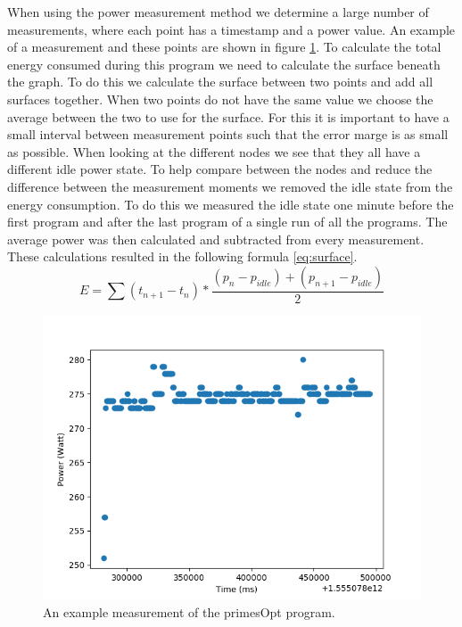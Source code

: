 When using the power measurement method we determine a large number of measurements, where each point has a timestamp and a power value. An example of a measurement and these points are shown in figure \ref{fig:primesOpt}. To calculate the total energy consumed during this program we need to calculate the surface beneath the graph. To do this we calculate the surface between two points and add all surfaces together. When two points do not have the same value we choose the average between the two to use for the surface. For this it is important to have a small interval between measurement points such that the error marge is as small as possible. When looking at the different nodes we see that they all have a different idle power state. To help compare between the nodes and reduce the difference between the measurement moments we removed the idle state from the energy consumption. To do this we measured the idle state one minute before the first program and after the last program of a single run of all the programs. The average power was then calculated and subtracted from every measurement. These calculations resulted in the following formula \ref{eq:surface}.\\

\begin{equation} \label{eq:surface}
    E = \sum (t_{n+1} - t_{n}) * \frac{(p_{n} - p_{idle}) + (p_{n+1} - p_{idle})}{2}
\end{equation}

\begin{figure}[h]
    \centering
    \includegraphics[width=.4\textwidth]{graphs/primesOpt.png}
    \caption{An example measurement of the primesOpt program.}
    \label{fig:primesOpt}
\end{figure}

